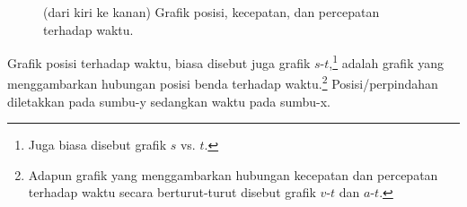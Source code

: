 \documentclass[12pt, a4paper]{article}\usepackage[utf8]{inputenc}
\theoremstyle{plain}
\theoremstyle{plain}
\numberwithin{equation}{section}
\theoremstyle{definition}
\begin{document}
\begin{center}
\begin{figure}[htb]
\begin{tikzpicture}[x=0.75pt,y=0.75pt,yscale=-1,xscale=1]
				
			\end{tikzpicture}
		\vspace{-2.5em}
		\caption{(dari kiri ke kanan) Grafik posisi, kecepatan, dan percepatan terhadap waktu.}
		\end{figure}
	\end{center}
	
	\vspace{-3em}
	Grafik posisi terhadap waktu, biasa disebut juga grafik $s$-$t$,\footnote{Juga biasa disebut grafik $s$ vs. $t$.} adalah grafik yang menggambarkan hubungan posisi benda terhadap waktu.\footnote{Adapun grafik yang menggambarkan hubungan kecepatan dan percepatan terhadap waktu secara berturut-turut disebut grafik $v$-$t$ dan $a$-$t$.} Posisi/perpindahan diletakkan pada sumbu-y sedangkan waktu pada sumbu-x.
	
\end{document}
